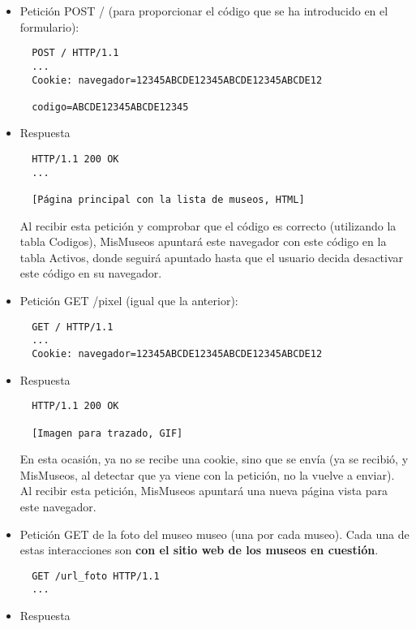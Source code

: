 {\begin{itemize}
\item Petición POST / (para proporcionar el código que se ha introducido en el formulario):

\begin{verbatim}
  POST / HTTP/1.1
  ...
  Cookie: navegador=12345ABCDE12345ABCDE12345ABCDE12

  codigo=ABCDE12345ABCDE12345
\end{verbatim}

\item Respuesta

\begin{verbatim}
  HTTP/1.1 200 OK
  ...

  [Página principal con la lista de museos, HTML]
\end{verbatim}

Al recibir esta petición y comprobar que el código es correcto (utilizando la tabla Codigos), MisMuseos apuntará este navegador con este código en la tabla Activos, donde seguirá apuntado hasta que el usuario decida desactivar este código en su navegador.


\item Petición GET /pixel (igual que la anterior):

\begin{verbatim}
  GET / HTTP/1.1
  ...
  Cookie: navegador=12345ABCDE12345ABCDE12345ABCDE12
\end{verbatim}

\item Respuesta

\begin{verbatim}
  HTTP/1.1 200 OK

  [Imagen para trazado, GIF]
\end{verbatim}

En esta ocasión, ya no se recibe una cookie, sino que se envía (ya se recibió, y MisMuseos, al detectar que ya viene con la petición, no la vuelve a enviar). Al recibir esta petición, MisMuseos apuntará una nueva página vista para este navegador.

\item Petición GET de la foto del museo museo (una por cada museo). Cada una de estas interacciones son {\bf con el sitio web de los museos en cuestión}.

\begin{verbatim}
  GET /url_foto HTTP/1.1
  ...
\end{verbatim}

\item Respuesta


\end{itemize}}
